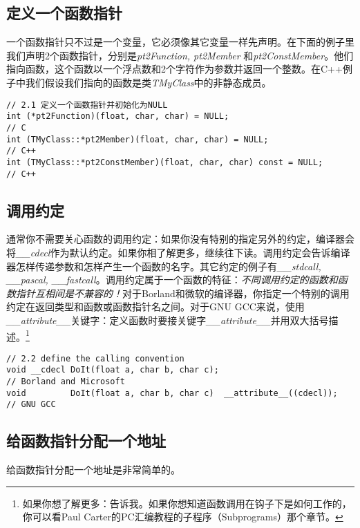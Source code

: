 \documentclass[11pt,a4paper]{article}
\begin{document}
\subsection{定义一个函数指针}
一个函数指针只不过是一个变量，它必须像其它变量一样先声明。在下面的例子里我们声明2个函数指针，分别是\textit{pt2Function, pt2Member} 和\textit{pt2ConstMember}。他们指向函数，这个函数以一个浮点数和2个字符作为参数并返回一个整数。在C++例子中我们假设我们指向的函数是类\textit{TMyClass}中的非静态成员。

\begin{lstlisting}
// 2.1 定义一个函数指针并初始化为NULL
int (*pt2Function)(float, char, char) = NULL;                        // C
int (TMyClass::*pt2Member)(float, char, char) = NULL;                // C++
int (TMyClass::*pt2ConstMember)(float, char, char) const = NULL;     // C++
\end{lstlisting}

\subsection{调用约定}
通常你不需要关心函数的调用约定：如果你没有特别的指定另外的约定，编译器会将\textit{\_\_cdecl}作为默认约定。如果你相了解更多，继续往下读。调用约定会告诉编译器怎样传递参数和怎样产生一个函数的名字。其它约定的例子有\textit{\_\_stdcall, \_\_pascal, \_\_fastcall}。调用约定属于一个函数的特征：\emph{不同调用约定的函数和函数指针互相间是不兼容的！}对于Borland和微软的编译器，你指定一个特别的调用约定在返回类型和函数或函数指针名之间。对于GNU GCC来说，使用\textit{\_\_attribute\_\_}关键字：定义函数时要接关键字\textit{\_\_attribute\_\_}并用双大括号描述。\footnote{如果你想了解更多：告诉我。如果你想知道函数调用在钩子下是如何工作的，你可以看Paul Carter的PC汇编教程的子程序（Subprograms）那个章节。}
\begin{lstlisting}
// 2.2 define the calling convention
void __cdecl DoIt(float a, char b, char c);                             // Borland and Microsoft
void         DoIt(float a, char b, char c)  __attribute__((cdecl));     // GNU GCC
\end{lstlisting}
\subsection{给函数指针分配一个地址}
给函数指针分配一个地址是非常简单的。
\end{document}
